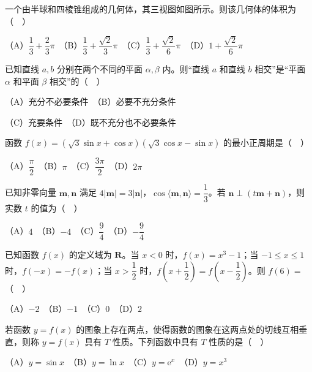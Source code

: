 \begin{question}
一个由半球和四棱锥组成的几何体，其三视图如图所示。则该几何体的体积为（　）
\nopagebreak[4]
\begin{center}\end{center}
\nopagebreak[4]
（A）\(\dfrac{1}{3}+\dfrac{2}{3}\pi\)　（B）\(\dfrac{1}{3}+\dfrac{\sqrt{2}}{3}\pi\)　（C）\(\dfrac{1}{3}+\dfrac{\sqrt{2}}{6}\pi\)　（D）\(1+\dfrac{\sqrt{2}}{6}\pi\)

\end{question}
\begin{question}
已知直线 \(a,b\) 分别在两个不同的平面 \(\alpha,\beta\) 内。则“直线 \(a\) 和直线 \(b\) 相交”是“平面 \(\alpha\) 和平面 \(\beta\) 相交”的（　）

（A）充分不必要条件　（B）必要不充分条件

（C）充要条件　（D）既不充分也不必要条件

\end{question}
\begin{question}
函数 \(f(x)=(\sqrt{3}\sin x+\cos x)(\sqrt{3}\cos x-\sin x)\) 的最小正周期是（　）

（A）\(\dfrac{\pi}{2}\)　（B）\(\pi\)　（C）\(\dfrac{3\pi}{2}\)　（D）\(2\pi\)

\end{question}
\begin{question}
已知非零向量 \(\mathbf{m},\mathbf{n}\) 满足 \(4|\mathbf{m}|=3|\mathbf{n}|\)，\(\cos\langle\mathbf{m},\mathbf{n}\rangle=\dfrac{1}{3}\)。若 \(\mathbf{n}\perp(t\mathbf{m}+\mathbf{n})\)，则实数 \(t\) 的值为（　）

（A）\(4\)　（B）\(-4\)　（C）\(\dfrac{9}{4}\)　（D）\(-\dfrac{9}{4}\)

\end{question}
\begin{question}
已知函数 \(f(x)\) 的定义域为 \(\mathbf{R}\)。当 \(x<0\) 时，\(f(x)=x^{3}-1\)；当 \(-1\leqslant x\leqslant 1\) 时，\(f(-x)=-f(x)\)；当 \(x>\dfrac{1}{2}\) 时，\(f\left(x+\dfrac{1}{2}\right)=f\left(x-\dfrac{1}{2}\right)\)。则 \(f(6)=\)（　）

（A）\(-2\)　（B）\(-1\)　（C）\(0\)　（D）\(2\)

\end{question}
\begin{question}
若函数 \(y=f(x)\) 的图象上存在两点，使得函数的图象在这两点处的切线互相垂直，则称 \(y=f(x)\) 具有 \(T\) 性质。下列函数中具有 \(T\) 性质的是（　）

（A）\(y=\sin x\)　（B）\(y=\ln x\)　（C）\(y=\mathrm{e}^{x}\)　（D）\(y=x^{3}\)

\end{question}

